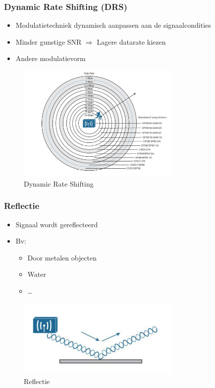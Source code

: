 \documentclass{article}
\begin{document}
\subsubsection{Dynamic Rate Shifting (DRS)}
\begin{itemize}
    \item Modulatietechniek dynamisch aanpassen aan de signaalcondities
    \item Minder gunstige SNR $\Rightarrow$ Lagere datarate kiezen
    \item Andere modulatievorm 
\end{itemize}

\begin{figure}[H]
    \centering
    \includegraphics[width=0.7\textwidth]{Screenshot_20200309_123624.png}
    \caption{Dynamic Rate Shifting}
\end{figure}

\subsubsection{Reflectie}
\begin{itemize}
    \item Signaal wordt gereflecteerd
    \item Bv:
    \begin{itemize}
        \item Door metalen objecten
        \item Water
        \item \dots
    \end{itemize}
\end{itemize}

\begin{figure}[H]
    \centering
    \includegraphics[width=0.7\textwidth]{Screenshot_20200309_124220.png}
    \caption{Reflectie}
\end{figure}
\end{document}
